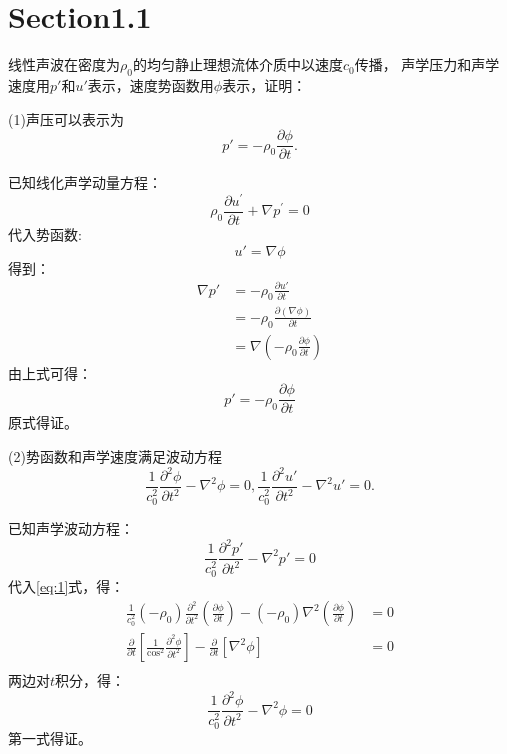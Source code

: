 \section*{Section1.1}

线性声波在密度为$\rho_0$的均匀静止理想流体介质中以速度$c_0$传播，
声学压力和声学速度用$p'$和$u'$表示，速度势函数用$\phi$表示，证明：

\noindent (1)声压可以表示为$$ p'=-\rho_0 \frac{\partial{\phi}}{\partial{t}} . $$

\noindent 已知线化声学动量方程：
\begin{equation}
    \rho_{0} \frac{\partial u^{\prime}}{\partial t}+\nabla p^{\prime}=0
\end{equation}
代入势函数:
\begin{equation}
    u'=\nabla \phi
    \label{eq:0}
\end{equation}
得到：
\begin{equation}
    \begin{aligned}
        \nabla p' &= - \rho_0 \frac{\partial u' }{\partial t} \\
                  &= - \rho_0 \frac{\partial (\nabla \phi) }{\partial t} \\
                  &= \nabla (- \rho_0 \frac{\partial \phi}{\partial t})
    \end{aligned}
\end{equation}
由上式可得：
\begin{equation}
    p' = -\rho_0 \frac{\partial{\phi}}{\partial{t}}
    \label{eq:1}
\end{equation}
原式得证。

\noindent (2)势函数和声学速度满足波动方程
$$\frac{1}{c_{0}^{2}} \frac{\partial^{2} \phi}{\partial t^{2}}-\nabla^{2} \phi=0,\frac{1}{c_{0}^{2}} \frac{\partial^{2} u'}{\partial t^{2}}-\nabla^{2} u'=0.$$

\noindent 已知声学波动方程：
\begin{equation}
    \frac{1}{c_{0}^{2}} \frac{\partial^{2} p'}{\partial t^{2}}-\nabla^{2} p'=0
\end{equation}
代入\eqref{eq:1}式，得：
\begin{equation}
    \begin{aligned}
        \frac{1}{c_{0}^{2}}\left(-\rho_{0}\right) \frac{\partial^{2}}{\partial t^{2}}\left(\frac{\partial \phi}{\partial t}\right)
        -\left(-\rho_{0}\right) \nabla^{2} (\frac{\partial \phi}{\partial t}) &= 0 \\
        \frac{\partial}{\partial t}\left[\frac{1}{\cos ^{2}} \frac{\partial^{2} \phi}{\partial t^{2}}\right]-
        \frac{\partial}{\partial t}\left[\nabla^{2} \phi\right] &= 0 \\
    \end{aligned}
\end{equation}
两边对$t$积分，得：
\begin{equation}
    \frac{1}{c_{0}^{2}} \frac{\partial^{2} \phi}{\partial t^{2}}-\nabla^{2} \phi=0
    \label{eq:2}
\end{equation}
第一式得证。

